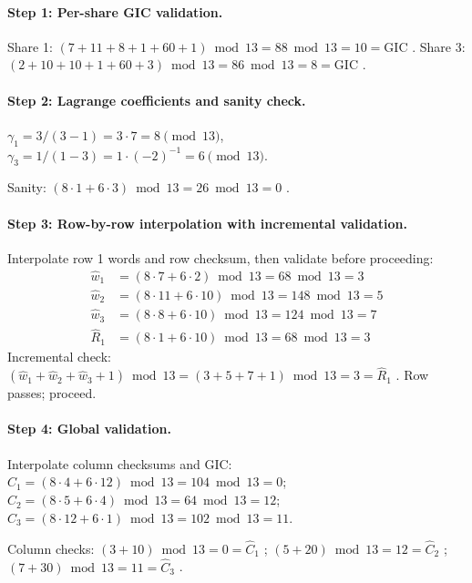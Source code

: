 \documentclass[11pt]{article}
\begin{document}
\paragraph{Step 1: Per-share GIC validation.}
Share 1: $(7{+}11{+}8{+}1{+}60{+}1) \bmod 13 = 88 \bmod 13 = 10 = \text{GIC}$ \checkmark.\;
Share 3: $(2{+}10{+}10{+}1{+}60{+}3) \bmod 13 = 86 \bmod 13 = 8 = \text{GIC}$ \checkmark.

\paragraph{Step 2: Lagrange coefficients and sanity check.}
$\gamma_1 = 3/(3{-}1) = 3 \cdot 7 = 8 \pmod{13}$,\; $\gamma_3 = 1/(1{-}3) = 1 \cdot (-2)^{-1} = 6 \pmod{13}$.

Sanity: $(8 \cdot 1 + 6 \cdot 3) \bmod 13 = 26 \bmod 13 = 0$ \checkmark.

\paragraph{Step 3: Row-by-row interpolation with incremental validation.}

Interpolate row 1 words and row checksum, then validate before proceeding:
\begin{align*}
\hat{w}_1 &= (8 \cdot 7 + 6 \cdot 2) \bmod 13 = 68 \bmod 13 = 3 \\
\hat{w}_2 &= (8 \cdot 11 + 6 \cdot 10) \bmod 13 = 148 \bmod 13 = 5 \\
\hat{w}_3 &= (8 \cdot 8 + 6 \cdot 10) \bmod 13 = 124 \bmod 13 = 7 \\
\hat{R}_1 &= (8 \cdot 1 + 6 \cdot 10) \bmod 13 = 68 \bmod 13 = 3
\end{align*}
Incremental check: $(\hat{w}_1 + \hat{w}_2 + \hat{w}_3 + 1) \bmod 13 = (3{+}5{+}7{+}1) \bmod 13 = 3 = \hat{R}_1$ \checkmark. Row passes; proceed.

\paragraph{Step 4: Global validation.}

Interpolate column checksums and GIC:
$\hat{C}_1 = (8 \cdot 4 + 6 \cdot 12) \bmod 13 = 104 \bmod 13 = 0$;\;
$\hat{C}_2 = (8 \cdot 5 + 6 \cdot 4) \bmod 13 = 64 \bmod 13 = 12$;\;
$\hat{C}_3 = (8 \cdot 12 + 6 \cdot 1) \bmod 13 = 102 \bmod 13 = 11$.

Column checks: $(3{+}10) \bmod 13 = 0 = \hat{C}_1$ \checkmark;\;
$(5{+}20) \bmod 13 = 12 = \hat{C}_2$ \checkmark;\;
$(7{+}30) \bmod 13 = 11 = \hat{C}_3$ \checkmark.
\end{document}
